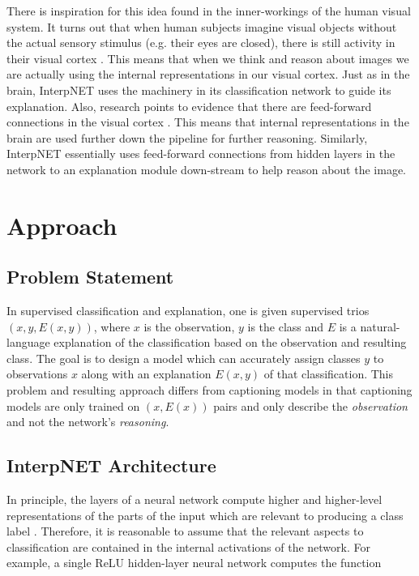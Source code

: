 \documentclass{article}
\begin{document}
There is inspiration for this idea found in the inner-workings of the human visual system. It turns out that when human subjects imagine visual objects without the actual sensory stimulus (e.g. their eyes are closed), there is still activity in their visual cortex \cite{kastner1999increased}. This means that when we think and reason about images we are actually using the internal representations in our visual cortex. Just as in the brain, InterpNET uses the machinery in its classification network to guide its explanation. Also, research points to evidence that there are feed-forward connections in the visual cortex \cite{lamme1998feedforward}. This means that internal representations in the brain are used further down the pipeline for further reasoning. Similarly, InterpNET essentially uses feed-forward connections from hidden layers in the network to an explanation module down-stream to help reason about the image.

\section{Approach}
\subsection{Problem Statement}

In supervised classification and explanation, one is given supervised trios $(x, y, E(x, y))$, where $x$ is the observation, $y$ is the class and $E$ is a natural-language explanation of the classification based on the observation and resulting class. The goal is to design a model which can accurately assign classes $y$ to observations $x$ along with an explanation $E(x, y)$ of that classification. This problem and resulting approach differs from captioning models in that captioning models are only trained on $(x, E(x))$ pairs and only describe the \emph{observation} and not the network's \emph{reasoning}.

\subsection{InterpNET Architecture}

In principle, the layers of a neural network compute higher and higher-level representations of the parts of the input which are relevant to producing a class label \cite{bengio2013representation}. Therefore, it is reasonable to assume that the relevant aspects to classification are contained in the internal activations of the network. For example, a single ReLU hidden-layer neural network computes the function
\end{document}
